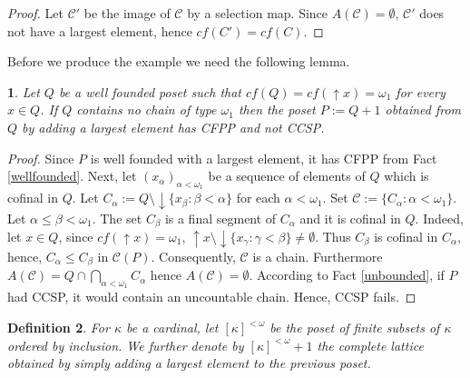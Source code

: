 \documentclass[12pt]{amsart}
\newtheorem{definition}{{\bf Definition}}[section]
\newtheorem{lemma}[definition]{\noindent {\bf Lemma}}
\begin{document}
\begin{proof} 
Let $\mathcal C'$ be the image of $\mathcal C$ by a selection
map. Since $A(\mathcal C)=\emptyset$, $\mathcal C'$ does not have a
largest element, hence $cf(C')=cf(C)$.
\end{proof}

\vspace{.3cm}

Before we produce the example we need the following lemma. 

\begin{lemma}\label{lem:notCCFP} 
Let $Q$ be a well founded poset such that $cf(Q)=cf({\uparrow \!\!}
x)=\omega_1$ for every $x\in Q$. If $Q$ contains no chain of type
$\omega_1$ then the poset $P:=Q+1$ obtained from $Q$ by adding a
largest element has CFPP and not CCSP.
\end{lemma}

\begin{proof}
Since $P$ is well founded with a largest element, it has CFPP from
Fact \ref{wellfounded}. Next, let $(x_{\alpha})_{\alpha<\omega_1}$ be
a sequence of elements of $Q$ which is cofinal in $Q$. Let
$C_{\alpha}:= Q\setminus {\downarrow \!\!}\{ x_{\beta}: \beta <\alpha\}$ for
each $\alpha<\omega_1$. Set $\mathcal C:= \{C_{\alpha}:
\alpha<\omega_1\}$. Let $\alpha\leq \beta<\omega_1$.  The set
$C_{\beta}$ is a final segment of $C_{\alpha }$ and it is cofinal in $Q$.
Indeed, let $x\in Q$, since $cf({\uparrow \!\!} x)= \omega_1$,
${\uparrow \!\!} x\setminus {\downarrow \!\!} \{ x_{\gamma}: \gamma
<\beta\}\not= \emptyset$.  Thus $C_{\beta}$ is cofinal in $C_{\alpha}$,
hence, $C_{\alpha}\leq C_{\beta}$ in $\mathcal C (P)$. Consequently,
$\mathcal C$ is a chain. Furthermore $A(\mathcal C)=Q\cap
\bigcap_{\alpha<\omega_1} C_{\alpha }$ hence $A(\mathcal
C)=\emptyset$.  According to Fact \ref{unbounded}, if $P$ had CCSP, it
would contain an uncountable chain.  Hence, CCSP fails.
\end{proof}

\vspace{.3cm}

\begin{definition}
For $\kappa$ be a cardinal, let $[\kappa]^{<\omega}$ be the poset of
finite subsets of $\kappa$ ordered by inclusion.  We further denote by
$[\kappa]^{<\omega}+1$ the complete lattice obtained by simply adding
a largest element to the previous poset.

\end{definition}
\end{document}
